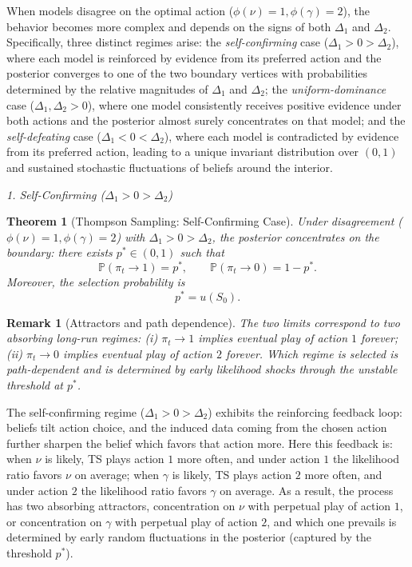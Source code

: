 \documentclass[12pt]{article}
\newtheorem{theorem}{Theorem}
\newtheorem{remark}{Remark}
\begin{document}
When models disagree on the optimal action ($\phi(\nu) = 1, \phi(\gamma) = 2$), the behavior becomes more complex and depends on the signs of both $\Delta_1$ and $\Delta_2$. Specifically, three distinct regimes arise: the \textit{self-confirming} case ($\Delta_1 > 0 > \Delta_2$), where each model is reinforced by evidence from its preferred action and the posterior converges to one of the two boundary vertices with probabilities determined by the relative magnitudes of $\Delta_1$ and $\Delta_2$; the \textit{uniform-dominance} case ($\Delta_1, \Delta_2 > 0$), where one model consistently receives positive evidence under both actions and the posterior almost surely concentrates on that model; and the \textit{self-defeating} case ($\Delta_1 < 0 < \Delta_2$), where each model is contradicted by evidence from its preferred action, leading to a unique invariant distribution over $(0,1)$ and sustained stochastic fluctuations of beliefs around the interior.

\vspace{1em}
\noindent\textit{1. Self-Confirming ($\Delta_1 > 0 > \Delta_2$)}

\begin{theorem}[Thompson Sampling: Self-Confirming Case]
\label{thm:self_confirming}
Under disagreement ($\phi(\nu)=1,\phi(\gamma)=2$) with $\Delta_1>0>\Delta_2$, the posterior concentrates on the boundary: there exists $p^*\in(0,1)$ such that
\[\mathbb{P}(\pi_t\to 1)=p^*,\qquad \mathbb{P}(\pi_t\to 0)=1-p^*.\]
Moreover, the selection probability is
\[
p^* = u(S_0).
\]
\end{theorem}
\begin{remark}[Attractors and path dependence]
The two limits correspond to two absorbing long-run regimes: (i) $\pi_t\to 1$ implies eventual play of action $1$ forever; (ii) $\pi_t\to 0$ implies eventual play of action $2$ forever. Which regime is selected is path-dependent and is determined by early likelihood shocks through the unstable threshold at $p^*$.
\end{remark}

The self-confirming regime ($\Delta_1>0>\Delta_2$) exhibits the reinforcing feedback loop: beliefs tilt action choice, and the induced data coming from the chosen action further sharpen the belief which favors that action more. Here this feedback is: when $\nu$ is likely, TS plays action $1$ more often, and under action $1$ the likelihood ratio favors $\nu$ on average; when $\gamma$ is likely, TS plays action $2$ more often, and under action $2$ the likelihood ratio favors $\gamma$ on average. As a result, the process has two absorbing attractors, concentration on $\nu$ with perpetual play of action $1$, or concentration on $\gamma$ with perpetual play of action $2$, and which one prevails is determined by early random fluctuations in the posterior (captured by the threshold $p^*$).
\end{document}
